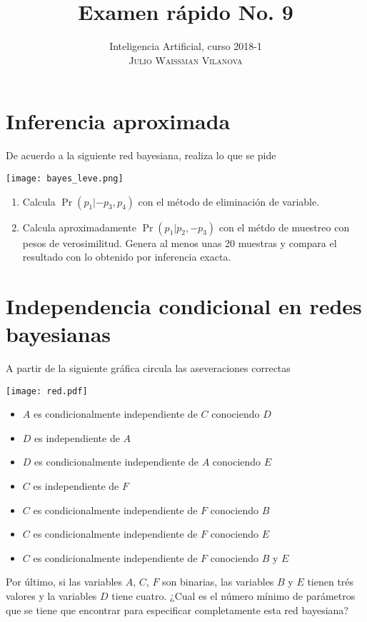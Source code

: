 \documentclass[onecolumn, letter, 11pt]{article}
\title{Examen rápido No. 9}
\author{Inteligencia Artificial, curso 2018-1\\ \textsc{Julio Waissman Vilanova}}
\date{}
\begin{document}
\maketitle

\section{Inferencia aproximada}

De acuerdo a la siguiente red bayesiana, realiza lo que se pide

\begin{center}
  \texttt{[image: bayes\_leve.png]}
\end{center}

\begin{enumerate}
\item Calcula $\Pr(p_1|-p_3, p_4)$ con el método de eliminación de variable.
\item Calcula aproximadamente $\Pr(p_1|p_2, -p_3)$ con el métdo de
  muestreo con pesos de verosimilitud. Genera al menos unas 20
  muestras y compara el resultado con lo obtenido por inferencia
  exacta.
\end{enumerate}

\newpage
\section{Independencia condicional en redes bayesianas}

A partir de la siguiente gráfica circula las aseveraciones correctas
\begin{center}
  \texttt{[image: red.pdf]}
\end{center}

\begin{itemize}
\item $A$ es condicionalmente independiente de $C$ conociendo $D$
\item $D$ es independiente de $A$
\item $D$ es condicionalmente independiente de $A$ conociendo $E$
\item $C$ es independiente de $F$
\item $C$ es condicionalmente independiente de $F$ conociendo $B$
\item $C$ es condicionalmente independiente de $F$ conociendo $E$
\item $C$ es condicionalmente independiente de $F$ conociendo $B$ y $E$
\end{itemize}

Por último, si las variables $A$, $C$, $F$ son binarias, las variables $B$ y $E$ tienen trés valores y la variables $D$ tiene cuatro. ¿Cual es el número mínimo de parámetros que se tiene que encontrar para especificar completamente esta red bayesiana?
\end{document}
